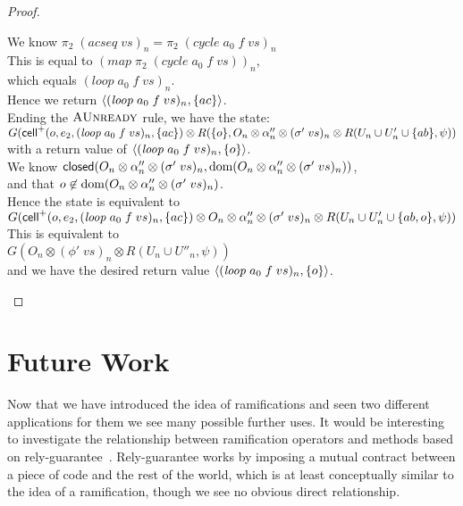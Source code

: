 \begin{proof}
\begin{enumerate}
\begin{tabbedproof}
  \ooo We know $\pi_2\;(acseq\;vs)_n = \pi_2\;(cycle\;a_0\;f\;vs)_n$ \\
  \ooo This is equal to $(\mathit{map}\;\pi_2\;(cycle\;a_0\;f\;vs))_n$, \\
  \ooo which equals $(\mathit{loop}\;a_0\;f\;vs)_n$. \\
  \ooo Hence we return $\left<{(\mathit{loop}\;a_0\;f\;vs)_n},{\{{ac}\}}\right>$. \\
  \ooo Ending the $\textsc{AUnready}$ rule, we have the state: \\
  \oooo $G(\mathsf{cell}^{+}({o}, {e_2}, {(\mathit{loop}\;a_0\;f\;vs)_n}, {\{{ac}\}}) \otimes R(\{{o}\}, O_n \otimes \alpha''_n \otimes (\sigma'\;vs)_n \otimes R(U_n \cup U'_n \cup \{{ab}\}, \psi))$ \\
  \ooo with a return value of $\left<{(\mathit{loop}\;a_0\;f\;vs)_n},{\{{o}\}}\right>$. \\
  \ooo We know $\mathsf{closed}({O_n \otimes \alpha''_n \otimes (\sigma'\;vs)_n}, {\mbox{dom}({O_n \otimes \alpha''_n \otimes (\sigma'\;vs)_n})})$, \\
  \ooo and that $o \not\in \mbox{dom}({O_n \otimes \alpha''_n \otimes (\sigma'\;vs)_n})$. \\
  \ooo Hence the state is equivalent to \\ 
  \oooo 
$G(\mathsf{cell}^{+}({o}, {e_2}, {(\mathit{loop}\;a_0\;f\;vs)_n}, {\{{ac}\}}) \otimes O_n \otimes \alpha''_n \otimes (\sigma'\;vs)_n \otimes R(U_n \cup U'_n \cup \{{ab,o}\}, \psi))$ \\
  \ooo This is equivalent to \\
  \oooo $G(O_n \otimes  (\phi'\;vs)_n \otimes R(U_n \cup U''_n, \psi))$ \\
  \ooo and we have the desired return value $\left<{(\mathit{loop}\;a_0\;f\;vs)_n},{\{{o}\}}\right>$. \\

  \end{tabbedproof}
\end{enumerate}
\end{proof}

\section{Future Work}

Now that we have introduced the idea of ramifications and seen two
different applications for them we see many possible further uses.  It
would be interesting to investigate the relationship between
ramification operators and methods based on
rely-guarantee~\cite{rely-guarantee-jones}. Rely-guarantee works by
imposing a mutual contract between a piece of code and the rest of the
world, which is at least conceptually similar to the idea of a
ramification, though we see no obvious direct relationship.


